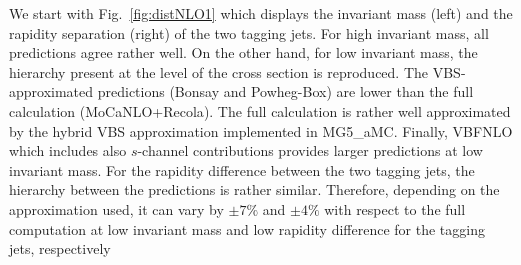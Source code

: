 \documentclass[twocolumn,epjc3]{svjour3} %
\begin{document}
    We start with Fig.~\ref{fig:distNLO1} which displays the invariant mass (left) and the rapidity separation (right) of the two tagging jets.
    For high invariant mass, all predictions agree rather well.
    On the other hand, for low invariant mass, the hierarchy present at the level of the cross section is reproduced.
    The VBS-approximated predictions ({\sc Bonsay} and {\sc Powheg-Box}) are lower than the full calculation ({\sc MoCaNLO}+{\sc Recola}).
    The full calculation is rather well approximated by the hybrid VBS approximation implemented in {\sc MG5\_aMC}.
    Finally, {\sc VBFNLO} which includes also $s$-channel contributions provides larger predictions at low invariant mass.
    For the rapidity difference between the two tagging jets, the hierarchy between the predictions is rather similar.
    Therefore, depending on the approximation used, it can vary by $\pm7\%$ and $\pm4\%$ with respect to the full computation at low invariant mass and low rapidity difference for the tagging jets, respectively
\end{document}
